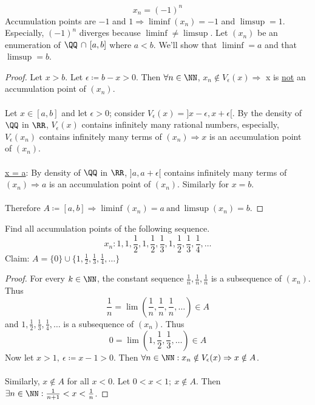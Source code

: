 \documentclass[class=scrartcl, crop=false]{standalone}
\begin{document}
\begin{example}
  \begin{enumerate}
    \ii[]
    \ii
    \[
      x_n = (-1)^n
    \]
    Accumulation points are $-1$ and $1 \Rightarrow \liminf(x_n) = -1$ and $\limsup = 1$. Especially, $(-1)^n$ diverges because $\liminf \neq \limsup$.
    \ii
    Let $(x_n)$ be an enumeration of $\QQ \, \cap \, [a, b]$ where $a < b$. We'll show that $\liminf = a$ and that $\limsup = b$.
    \begin{proof}
      Let $x > b$. Let $\epsilon \coloneqq b - x > 0$. Then $\forall n \in \NN$, $x_n \notin V_\epsilon(x) \Rightarrow$ x is \ul{not} an accumulation point of $(x_n)$.
      \\\\
      Let $x \in [a, b]$ and let $\epsilon > 0$; consider $V_\epsilon(x) = ]x - \epsilon, x + \epsilon[$. By the density of $\QQ$ in $\RR$, $V_\epsilon(x)$ contains infinitely many rational numbers, especially, $V_\epsilon(x_n)$ contains infinitely many terms of $(x_n) \Rightarrow x$ is an accumulation point of $(x_n)$.
      \\\\
      \ul{x = a}: By density of $\QQ$ in $\RR$, $]a, a + \epsilon[$ contains infinitely many terms of $(x_n) \Rightarrow a$ is an accumulation point of $(x_n)$.
      Similarly for $x = b$.
      \\\\
      Therefore $A \coloneqq [a, b] \Rightarrow \liminf(x_n) = a \ \text{and} \ \limsup(x_n) = b$.
    \end{proof}
    \ii
    Find all accumulation points of the following sequence.
    \[
      x_n : 1, 1,  \frac{1}{2}, 1, \frac{1}{2}, \frac{1}{3}, 1, \frac{1}{2}, \frac{1}{3}, \frac{1}{4}, \dots
    \]
    Claim: $A = \{0\} \cup \{1, \frac{1}{2}, \frac{1}{3}, \frac{1}{4}, \dots\}$
    \begin{proof}
      For every $k \in \NN$, the constant sequence $\frac{1}{n}, \frac{1}{n}, \frac{1}{n}$ is a subsequence of $(x_n)$. Thus 
      \[
        \frac{1}{n} = \lim(\frac{1}{n}, \frac{1}{n}, \frac{1}{n}, \dots) \in A
      \]
      and $1, \frac{1}{2}, \frac{1}{3}, \frac{1}{4}, \dots$ is a subsequence of $(x_n)$. Thus
      \[
        0 = \lim(1, \frac{1}{2}, \frac{1}{3}, \dots) \in A
      \]
      Now let $x > 1, \ \epsilon \coloneqq x - 1 > 0$. Then $\forall n \in \NN : x_n \notin V_\epsilon(x) \Rightarrow x \notin A$.
      \\\\
      Similarly, $x \notin A$ for all $x < 0$. Let $0 < x < 1; \ x \notin A$. Then $\exists n \in \NN : \frac{1}{n + 1} < x < \frac{1}{n}$.

\end{proof}
\end{enumerate}
\end{example}
\end{document}
